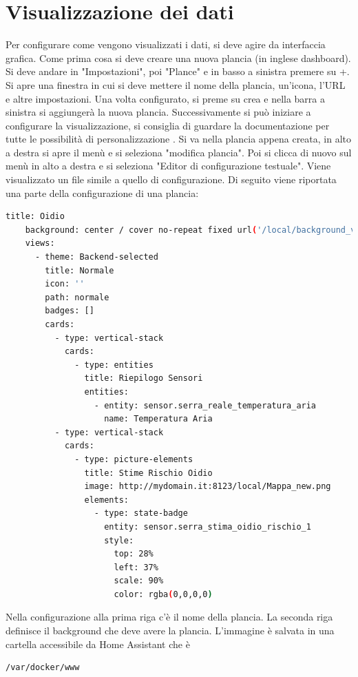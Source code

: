 \section{Visualizzazione dei dati}
\label{sec:hass-visualizzazione}
Per configurare come vengono visualizzati i dati, si deve agire da interfaccia grafica.
Come prima cosa si deve creare una nuova plancia (in inglese dashboard).
Si deve andare in "Impostazioni", poi "Plance" e in basso a sinistra premere su +.
Si apre una finestra in cui si deve mettere il nome della plancia, un'icona, l'URL e altre impostazioni.
Una volta configurato, si preme su crea e nella barra a sinistra si aggiungerà la nuova plancia.
Successivamente si può iniziare a configurare la visualizzazione,
si consiglia di guardare la documentazione per tutte le possibilità di personalizzazione \cite{hass-dashboard}.
Si va nella plancia appena creata, in alto a destra si apre il menù e si seleziona "modifica plancia".
Poi si clicca di nuovo sul menù in alto a destra e si seleziona "Editor di configurazione testuale".
Viene visualizzato un file simile a quello di configurazione.
Di seguito viene riportata una parte della configurazione di una plancia:
\begin{lstlisting}[language=bash]
    title: Oidio
    background: center / cover no-repeat fixed url('/local/background_verde_sfumature.jpg')
    views:
      - theme: Backend-selected
        title: Normale
        icon: ''
        path: normale
        badges: []
        cards:
          - type: vertical-stack
            cards:
              - type: entities
                title: Riepilogo Sensori
                entities:
                  - entity: sensor.serra_reale_temperatura_aria
                    name: Temperatura Aria
          - type: vertical-stack
            cards:
              - type: picture-elements
                title: Stime Rischio Oidio
                image: http://mydomain.it:8123/local/Mappa_new.png
                elements:
                  - type: state-badge
                    entity: sensor.serra_stima_oidio_rischio_1
                    style:
                      top: 28%
                      left: 37%
                      scale: 90%
                      color: rgba(0,0,0,0)
\end{lstlisting}
Nella configurazione alla prima riga c'è il nome della plancia.
La seconda riga definisce il background che deve avere la plancia.
L'immagine è salvata in una cartella accessibile da Home Assistant che è 
\begin{lstlisting}[language=textnonum]
    /var/docker/www
\end{lstlisting}
